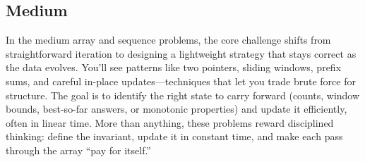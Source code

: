 \subsection{Medium}

In the medium array and sequence problems, the core challenge shifts from straightforward iteration to designing a lightweight strategy that stays correct as the data evolves. 
You’ll see patterns like two pointers, sliding windows, prefix sums, and careful in-place updates—techniques that let you trade brute force for structure. 
The goal is to identify the right state to carry forward (counts, window bounds, best-so-far answers, or monotonic properties) and update it efficiently, often in linear time. 
More than anything, these problems reward disciplined thinking: define the invariant, update it in constant time, and make each pass through the array “pay for itself.”



% 
% 

